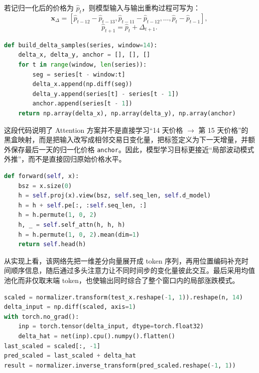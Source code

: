 若记归一化后的价格为 $\hat{p}_t$，则模型输入与输出重构过程可写为：
\begin{equation}
\mathbf{x}_{\Delta}=
[\hat{p}_{t-12}-\hat{p}_{t-13},\hat{p}_{t-11}-\hat{p}_{t-12},\ldots,\hat{p}_{t}-\hat{p}_{t-1}],
\end{equation}
\begin{equation}
\hat{p}_{t+1} = \hat{p}_{t} + \Delta_{t+1}.
\end{equation}

\begin{lstlisting}[language=Python,caption={Attention 方案的差分样本构造}]
def build_delta_samples(series, window=14):
    delta_x, delta_y, anchor = [], [], []
    for t in range(window, len(series)):
        seg = series[t - window:t]
        delta_x.append(np.diff(seg))
        delta_y.append(series[t] - series[t - 1])
        anchor.append(series[t - 1])
    return np.array(delta_x), np.array(delta_y), np.array(anchor)
\end{lstlisting}

这段代码说明了 Attention 方案并不是直接学习“14 天价格 $\rightarrow$ 第 15 天价格”的黑盒映射，而是把输入改写成相邻交易日变化量，把标签定义为下一天增量，并额外保存最后一天的归一化价格 \texttt{anchor}。因此，模型学习目标更接近“局部波动模式外推”，而不是直接回归原始价格水平。

\begin{lstlisting}[language=Python,caption={自注意力前向传播的核心实现}]
def forward(self, x):
    bsz = x.size(0)
    h = self.proj(x).view(bsz, self.seq_len, self.d_model)
    h = h + self.pe[:, :self.seq_len, :]
    h = h.permute(1, 0, 2)
    h, _ = self.self_attn(h, h, h)
    h = h.permute(1, 0, 2).mean(dim=1)
    return self.head(h)
\end{lstlisting}

从实现上看，该网络先把一维差分向量展开成 token 序列，再用位置编码补充时间顺序信息，随后通过多头注意力让不同时间步的变化量彼此交互。最后采用均值池化而非仅取末端 token，也使输出同时综合了整个窗口内的局部涨跌模式。

\begin{lstlisting}[language=Python,caption={Attention 提交接口中的增量重构}]
scaled = normalizer.transform(test_x.reshape(-1, 1)).reshape(n, 14)
delta_input = np.diff(scaled, axis=1)
with torch.no_grad():
    inp = torch.tensor(delta_input, dtype=torch.float32)
    delta_hat = net(inp).cpu().numpy().flatten()
last_scaled = scaled[:, -1]
pred_scaled = last_scaled + delta_hat
result = normalizer.inverse_transform(pred_scaled.reshape(-1, 1))
\end{lstlisting}

